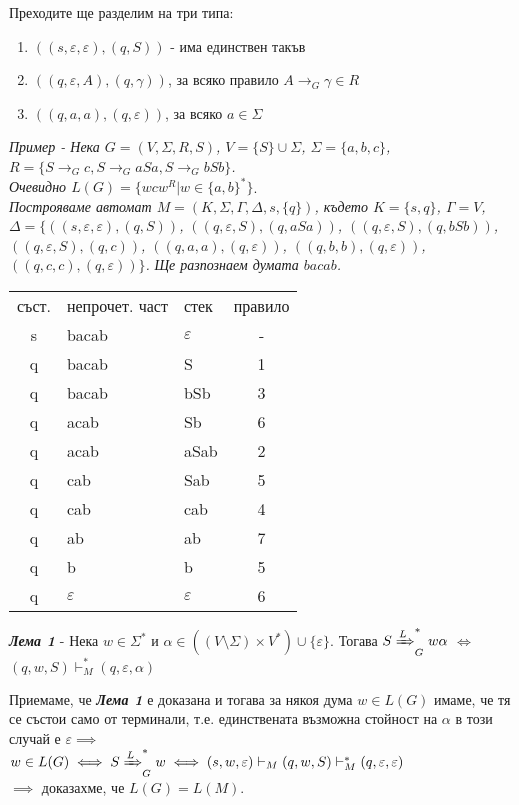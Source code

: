 \documentclass[fleqn,12pt]{article}
\begin{document}
\begin{flushleft}
Преходите ще разделим на три типа:
\begin{enumerate}
    \item $((s, \varepsilon, \varepsilon), (q, S))$ - има единствен такъв
    \item \label{transition_type:two} $((q, \varepsilon, A), (q, \gamma))$, за всяко правило $ A \to_G \gamma \in R$
    \item $((q, a, a), (q, \varepsilon))$, за всяко $a \in \Sigma$
\end{enumerate}

\textit{Пример - Нека $G = (V, \Sigma, R, S)$, $V = \{S\} \cup \Sigma$, $\Sigma = \{a, b, c\}$, $R = \{S \to_G c, S \to_G aSa, S \to_G bSb\}$.} \\
\textit{Очевидно $L(G) = \{wcw^R | w \in \{a, b\}^*\}$}. \\
\textit{Построяваме автомат $M = (K, \Sigma, \Gamma, \Delta, s, \{q\})$, където $K = \{s, q\}$, $\Gamma = V$, $\Delta = \{$$((s, \varepsilon, \varepsilon), (q, S))$, $((q, \varepsilon, S), (q, aSa))$, $((q, \varepsilon, S), (q, bSb))$, $((q, \varepsilon, S), (q, c))$, $((q, a, a), (q, \varepsilon))$, $((q, b, b), (q, \varepsilon))$, $((q, c, c), (q, \varepsilon))$$\}$.}
\textit{Ще разпознаем думата $bacab$.}

\begin{tabular}{ |c|l|l|c| } 
\hline
съст. & непрочет. част & стек & правило \\ 
s & bacab & $\varepsilon$ & - \\
q & bacab & S & 1 \\
q & bacab & bSb & 3 \\
q & acab & Sb & 6 \\
q & acab & aSab & 2 \\
q & cab & Sab & 5 \\
q & cab & cab & 4 \\
q & ab & ab & 7 \\
q & b & b & 5 \\
q & $\varepsilon$ & $\varepsilon$ & 6 \\
\hline
\end{tabular}

\textit{\textbf{Лема 1}} - Нека $w \in \Sigma^*$ и $\alpha \in ((V \setminus \Sigma) \times V^*) \cup \{\varepsilon\}$.
Тогава $S \xRightarrow[]{L}_G^* w\alpha$ $\iff$ $(q, w, S) \vdash_M^* (q, \varepsilon, \alpha)$

Приемаме, че \textit{\textbf{Лема 1}} е доказана и тогава за някоя дума $w \in L(G)$ имаме, че тя се състои само от терминали, т.е. единствената възможна стойност на $\alpha$ в този случай е $\varepsilon \implies$ \\
$w \in L(G) \iff S \xRightarrow[]{L}_G^* w \iff (s, w, \varepsilon) \vdash_M (q, w, S) \vdash_M^* (q, \varepsilon, \varepsilon)$ \\
$\implies$ доказахме, че $L(G) = L(M)$.


\end{flushleft}
\end{document}
